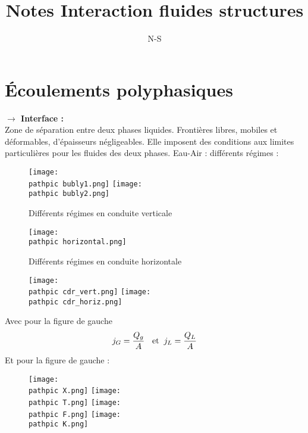 \documentclass[a4paper,10pt]{article}
\title{Notes Interaction fluides structures}
\author{N-S }
\newcommand{\bl}{\color{blue}}
\newcommand{\bk}{\color{black}}
\newcommand{\pathpic}{/home/saura/Documents/Latex_files/Pic/}
\begin{document}
\vspace{-1cm} \bl
\section{Écoulements polyphasiques} \bk
\noindent \textbf{$\rightarrow$ Interface :\\}
Zone de séparation entre deux phases liquides. Frontières libres, mobiles et déformables, d'épaisseurs négligeables. Elle imposent des conditions aux limites particulières pour les fluides des deux phases. Eau-Air : différents régimes :

\begin{figure}[!ht]
\centering
\texttt{[image: \\pathpic bubly1.png]} \hfill
\texttt{[image: \\pathpic bubly2.png]}
\caption{Différents régimes en conduite verticale}
\end{figure}

\begin{figure}[!ht]
\centering
\texttt{[image: \\pathpic horizontal.png]}
\caption{Différents régimes en conduite horizontale}
\end{figure}

\begin{figure}[!ht]
\centering
\texttt{[image: \\pathpic cdr\_vert.png]} \hfill
\texttt{[image: \\pathpic cdr\_horiz.png]}
\end{figure}
Avec pour la figure de gauche \bl
\begin{equation*}
j_G = \frac{Q_g}{A} \text{\hspace{2mm} \bk et\bl \hspace{2mm}} j_L = \frac{Q_L}{A}
\end{equation*}
\bk Et pour la figure de gauche :

\begin{figure}[!ht]
\centering
\texttt{[image: \\pathpic X.png]} \hfill
\texttt{[image: \\pathpic T.png]} \hfill
\texttt{[image: \\pathpic F.png]} \hfill
\texttt{[image: \\pathpic K.png]} 
\end{figure}
\end{document}
